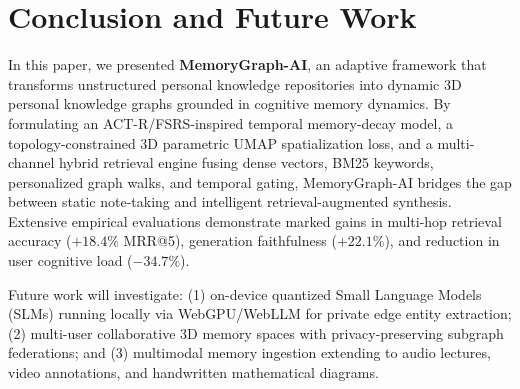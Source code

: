 \section{Conclusion and Future Work}
\label{sec:conclusion}

In this paper, we presented \textbf{MemoryGraph-AI}, an adaptive framework that transforms unstructured personal knowledge repositories into dynamic 3D personal knowledge graphs grounded in cognitive memory dynamics. By formulating an ACT-R/FSRS-inspired temporal memory-decay model, a topology-constrained 3D parametric UMAP spatialization loss, and a multi-channel hybrid retrieval engine fusing dense vectors, BM25 keywords, personalized graph walks, and temporal gating, MemoryGraph-AI bridges the gap between static note-taking and intelligent retrieval-augmented synthesis. Extensive empirical evaluations demonstrate marked gains in multi-hop retrieval accuracy ($+18.4\%$ MRR@5), generation faithfulness ($+22.1\%$), and reduction in user cognitive load ($-34.7\%$).

Future work will investigate: (1) on-device quantized Small Language Models (SLMs) running locally via WebGPU/WebLLM for private edge entity extraction; (2) multi-user collaborative 3D memory spaces with privacy-preserving subgraph federations; and (3) multimodal memory ingestion extending to audio lectures, video annotations, and handwritten mathematical diagrams.
